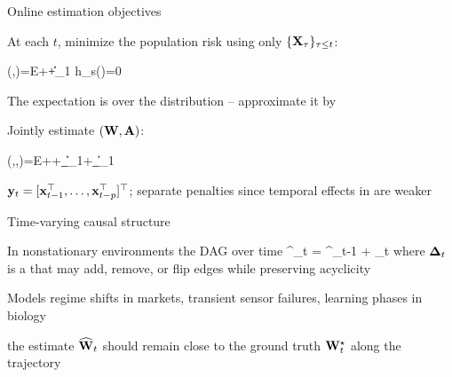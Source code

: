 \documentclass[9pt, aspectratio=169, xcolor=table]{beamer}
\newcommand{\EE}{{\mathbb E}}
\begin{document}
\begin{frame}{Online estimation objectives}

	\bi {} At each $t$, minimize the population risk using only $\{{\mathbf X}_\tau\}_{\tau\leq t}$:
	\begin{myblock}
		\be \ccalL(\bbW,\sigma)=\EE\!++\lambda\|\bbW\|_1 \quad {}\quad h_s(\bbW)=0 \ee
	\end{myblock}
	\ai The expectation is over the  distribution -- approximate it by \ei

	\pause

	\bi {} Jointly estimate $({\mathbf W},{\mathbf A})$:
	\begin{myblock}
		\be \ccalL(\bbW,\bbA,\sigma)=\EE\!++\lambda_{\bbW}\|\bbW\|_1+\lambda_{\bbA}\|\bbA\|_1 \ee
	\end{myblock}
	\ai ${\mathbf y}_t=[{\mathbf x}_{t-1}^\top,\ldots,{\mathbf x}_{t-p}^\top]^\top$; separate penalties since temporal effects in \darkpurple{$\bbA$} are weaker\ei

\end{frame}


\begin{frame}{Time-varying causal structure}\svpos

	\bi In nonstationary environments the DAG  over time
	\be \bbW^\star_t = \bbW^\star_{t-1} + \bbDelta_t \ee
	where $\boldsymbol{\Delta}_t$ is a  that may add, remove, or flip edges while preserving acyclicity\ei \svpos

	\bi Models regime shifts in markets, transient sensor failures, learning phases in biology \ei \svpos

	\pause

	\begin{myblock}
		\bi {} the estimate $\widehat{{\mathbf W}}_t$ should remain close to the  ground truth ${\mathbf W}^\star_t$ along the trajectory\ei
	\end{myblock}

\end{frame}
\end{document}
